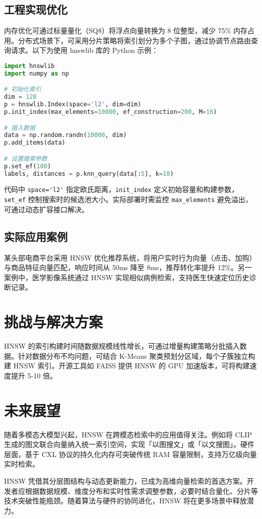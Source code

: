 \section{工程实现优化}
内存优化可通过标量量化（SQ8）将浮点向量转换为 8 位整型，减少 75\%{} 内存占用。分布式场景下，可采用分片策略将索引划分为多个子图，通过协调节点路由查询请求。以下为使用 hnswlib 库的 Python 示例：\par
\begin{lstlisting}[language=python]
import hnswlib
import numpy as np

# 初始化索引
dim = 128
p = hnswlib.Index(space='l2', dim=dim)
p.init_index(max_elements=10000, ef_construction=200, M=16)

# 插入数据
data = np.random.randn(10000, dim)
p.add_items(data)

# 设置搜索参数
p.set_ef(100)
labels, distances = p.knn_query(data[:5], k=10)
\end{lstlisting}
代码中 \verb!space='l2'! 指定欧氏距离，\verb!init_index! 定义初始容量和构建参数，\verb!set_ef! 控制搜索时的候选池大小。实际部署时需监控 \verb!max_elements! 避免溢出，可通过动态扩容接口解决。\par
\section{实际应用案例}
某头部电商平台采用 HNSW 优化推荐系统，将用户实时行为向量（点击、加购）与商品特征向量匹配，响应时间从 50ms 降至 8ms，推荐转化率提升 12\%{}。另一案例中，医学影像系统通过 HNSW 实现相似病例检索，支持医生快速定位历史诊断记录。\par
\chapter{挑战与解决方案}
HNSW 的索引构建时间随数据规模线性增长，可通过增量构建策略分批插入数据。针对数据分布不均问题，可结合 K-Means 聚类预划分区域，每个子簇独立构建 HNSW 索引。开源工具如 FAISS 提供 HNSW 的 GPU 加速版本，可将构建速度提升 5-10 倍。\par
\chapter{未来展望}
随着多模态大模型兴起，HNSW 在跨模态检索中的应用值得关注。例如将 CLIP 生成的图文联合向量纳入统一索引空间，实现「以图搜文」或「以文搜图」。硬件层面，基于 CXL 协议的持久化内存可突破传统 RAM 容量限制，支持万亿级向量实时检索。\par
HNSW 凭借其分层图结构与动态更新能力，已成为高维向量检索的首选方案。开发者应根据数据规模、维度分布和实时性需求调整参数，必要时结合量化、分片等技术突破性能瓶颈。随着算法与硬件的协同进化，HNSW 将在更多场景中释放潜力。\par
